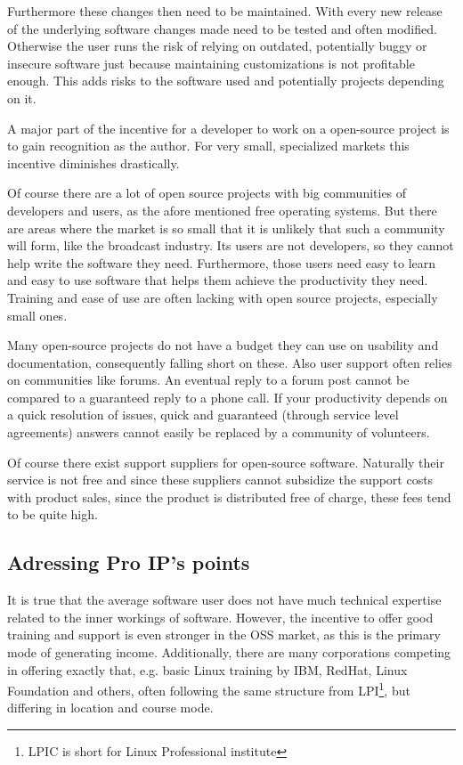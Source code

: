\documentclass[a4paper]{report}
\begin{document}
Furthermore these changes then need to be maintained. With every new release of the underlying software changes made need to be tested and often modified. Otherwise the user runs the risk of relying on outdated, potentially buggy or insecure software just because maintaining customizations is not profitable enough. This adds risks to the software used and potentially projects depending on it.
 
A major part of the incentive for a developer to work on a open-source project is to gain recognition as the author. For very small, specialized markets this incentive diminishes drastically. 

Of course there are a lot of open source projects with big communities of developers and users, as the afore mentioned free operating systems. But there are areas where the market is so small that it is unlikely that such a community will form, like the broadcast industry. Its users are not developers, so they cannot help write the software they need. Furthermore, those users need easy to learn and easy to use software that helps them achieve the productivity they need. Training and ease of use are often lacking with open source projects, especially small ones.

Many open-source projects do not have a budget they can use on usability and documentation, consequently falling short on these. Also user support often relies on communities like forums. An eventual reply to a forum post cannot be compared to a guaranteed reply to a phone call. If your productivity depends on a quick resolution of issues, quick and guaranteed (through service level agreements) answers cannot easily be replaced by a community of volunteers. 

Of course there exist support suppliers for open-source software. Naturally their service is not free and since these suppliers cannot subsidize the support costs with product sales, since the product is distributed free of charge, these fees tend to be quite high.

\subsection{Adressing Pro IP's points}
It is true that the average software user does not have much technical expertise related to the inner workings of software. However, the incentive to offer good training and support is even stronger in the OSS market, as this is the primary mode of generating income. Additionally, there are many corporations competing in offering exactly that, e.g. basic Linux training by IBM, RedHat, Linux Foundation and others, often following the same structure from LPI\footnote{LPIC is short for Linux Professional institute}, but differing in location and course mode.
\end{document}
